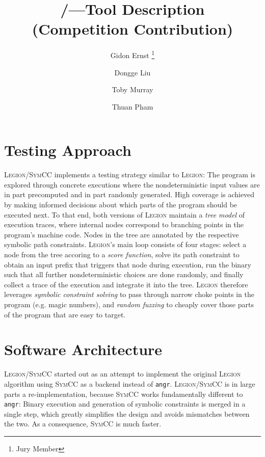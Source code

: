 \documentclass{llncs}
\author{
    Gidon Ernst
        \inst{1} \thanks{Jury Member}
\and
    Dongge Liu
        \inst{2}
\and
    Toby Murray
        \inst{2}
\and
    Thuan Pham
        \inst{2}
}
\title{\Legion/\SymCC---Tool Description \\ (Competition Contribution)}
\institute{
    LMU Munich, \mailto{gidon.ernst@lmu.de}
\and
    University of Melbourne,
    \mailto{donggel@student.unimelb.edu.au},
    \mailto{toby.murray@unimelb.edu.au},
    \mailto{thuan.pham@unimelb.edu.au}
}
\newcommand{\Legion}{\textsc{Legion}\xspace}
\newcommand{\SymCC}{\textsc{SymCC}\xspace}
\newcommand{\Angr}{\texttt{angr}\xspace}
\begin{document}
\maketitle

\begin{abstract}

\end{abstract}

\section{Testing Approach}
\label{sec:approach}

\Legion/\SymCC implements a testing strategy similar to \Legion:
The program is explored through concrete executions where the nondeterministic input values are in part precomputed and in part randomly generated.
High coverage is achieved by making informed decisions about which parts of the program should be executed next.
To that end, both versions of \Legion maintain a \emph{tree model} of execution traces, where internal nodes correspond to branching points in the program's machine code.
Nodes in the tree are annotated by the respective symbolic path constraints.
\Legion's main loop consists of four stages:
select a node from the tree accoring to a \emph{score function},
solve its path constraint to obtain an input prefix that triggers that node during execution,
run the binary such that all further nondeterministic choices are done randomly,
and finally collect a trace of the execution and integrate it into the tree.
\Legion therefore leverages \emph{symbolic constraint solving} to pass through
narrow choke points in the program (e.g. magic numbers),
and \emph{random fuzzing} to cheaply cover those parts of the program that are easy to target.


\section{Software Architecture}
\label{sec:architecture}

\Legion/\SymCC started out as an attempt to implement the original \Legion algorithm 
using \SymCC as a backend instead of \Angr.
\Legion/\SymCC is in large parts a re-implementation, because \SymCC works fundamentally different to \Angr:
Binary execution and generation of symbolic constraints is merged in a single step, which greatly simplifies the design and avoids mismatches between the two.
As a consequence, \SymCC is much faster.
\end{document}

